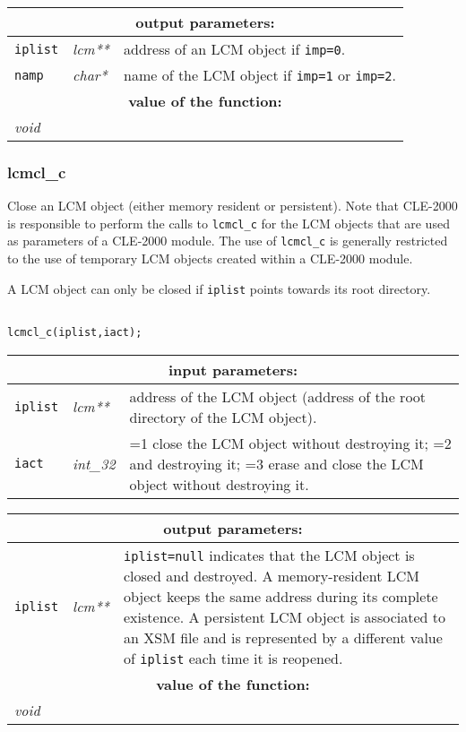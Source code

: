 \vskip 0.8cm

\noindent
\begin{tabular}{|p{1.5cm}|p{2cm}|p{11cm}|}
\hline
\multicolumn{3}{|c|}{\bf output parameters:} \\
\hline
{\tt iplist} & {\it lcm**} & address of an LCM object if {\tt imp=0}. \\
\hline
{\tt namp} & {\it char*} & name of the LCM object if {\tt imp=1} or {\tt imp=2}. \\
\hline
\multicolumn{3}{|c|}{\bf value of the function:} \\
\hline
\multicolumn{2}{|l|}{\it void} &  \\
\hline
\end{tabular}

\subsubsection{lcmcl\_c}

Close an LCM object (either memory resident or persistent). Note that CLE-2000 is responsible to perform the calls to
{\tt lcmcl\_c} for the LCM objects that are used as parameters of a CLE-2000 module. The use
of {\tt lcmcl\_c} is generally restricted to the use of temporary LCM objects created within a CLE-2000 module.

\vskip 0.2cm

A LCM object can only be closed if {\tt iplist} points towards its root directory.

\begin{verbatim}

lcmcl_c(iplist,iact);
\end{verbatim}

\noindent
\begin{tabular}{|p{1.5cm}|p{2cm}|p{11cm}|}
\hline
\multicolumn{3}{|c|}{\bf input parameters:} \\
\hline
{\tt iplist} & {\it lcm**} & address of the LCM object (address of the root directory of the LCM object). \\
\hline
{\tt iact} & {\it int\_32} & =1 close the LCM object without destroying it; =2 and destroying it; =3 erase and close the LCM object without destroying it. \\
\hline
\end{tabular}

\vskip 0.8cm

\noindent
\begin{tabular}{|p{1.5cm}|p{2cm}|p{11cm}|}
\hline
\multicolumn{3}{|c|}{\bf output parameters:} \\
\hline
{\tt iplist} & {\it lcm**} & {\tt iplist=null} indicates that the LCM object is closed and destroyed. A memory-resident LCM object keeps the
same address during its complete existence. A persistent LCM object is associated to an XSM file and is represented by a different
value of {\tt iplist} each time it is reopened. \\
\hline
\multicolumn{3}{|c|}{\bf value of the function:} \\
\hline
\multicolumn{2}{|l|}{\it void} &  \\
\hline
\end{tabular}

